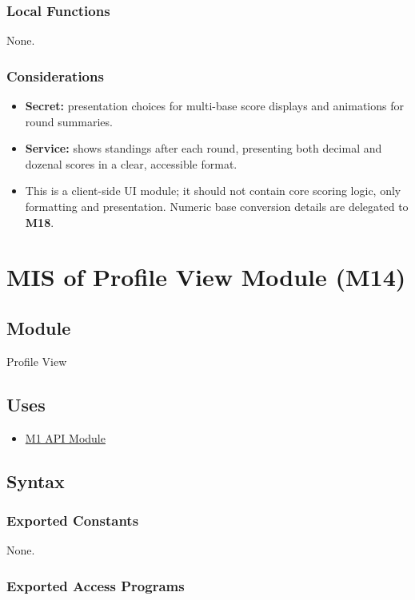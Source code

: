 \documentclass[12pt, titlepage]{article}
\begin{document}
\subsubsection{Local Functions}
None.

\subsubsection{Considerations}
\begin{itemize}
    \item \textbf{Secret:} presentation choices for multi-base score displays and animations for round summaries.
    \item \textbf{Service:} shows standings after each round, presenting both decimal and dozenal scores in a clear, accessible format.
    \item This is a client-side UI module; it should not contain core scoring logic, only formatting and presentation. Numeric base conversion details are delegated to \textbf{M18}.
\end{itemize}

\newpage
\section{MIS of Profile View Module (M14)}\label{sec:profile-view-module}

\subsection{Module}
Profile View

\subsection{Uses}
\begin{itemize}
    \item \hyperref[sec:api-module]{M1 API Module}
\end{itemize}

\subsection{Syntax}

\subsubsection{Exported Constants}
None.

\subsubsection{Exported Access Programs}
\end{document}
